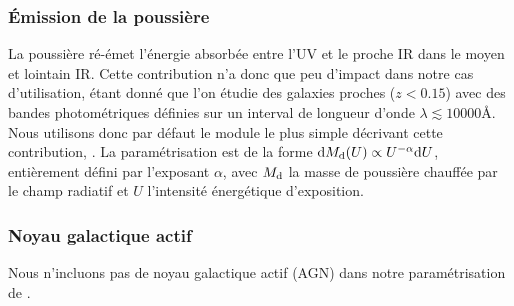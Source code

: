 \documentclass[../main/main.tex]{subfiles}
\begin{document}
\subsubsection{\'Emission de la poussière}

La poussière ré-émet l'énergie absorbée entre l'UV et le proche IR dans
le moyen et lointain IR. Cette contribution n'a donc que peu d'impact
dans notre cas d'utilisation, étant donné que l'on étudie des galaxies
proches ($z<0.15$) avec des bandes photométriques définies sur un
interval de longueur d'onde
${\lambda\lesssim10000}$\AA. Nous utilisons donc par défaut le module le plus
simple décrivant cette contribution, \textbf{}
\citep{Dale2014}. La paramétrisation est de la forme ${\mathrm{d} M_{\mathrm{d}}(U)\propto
U^{-\alpha}\mathrm{d} U}$, entièrement défini par l'exposant $\alpha$, avec
$M_{\mathrm{d}}$ la masse de poussière chauffée par le champ radiatif et $U$ l'intensité énergétique d'exposition.

\subsubsection{Noyau galactique actif}

Nous n'incluons pas de noyau galactique actif (AGN) dans notre paramétrisation de \cigale.
\end{document}
